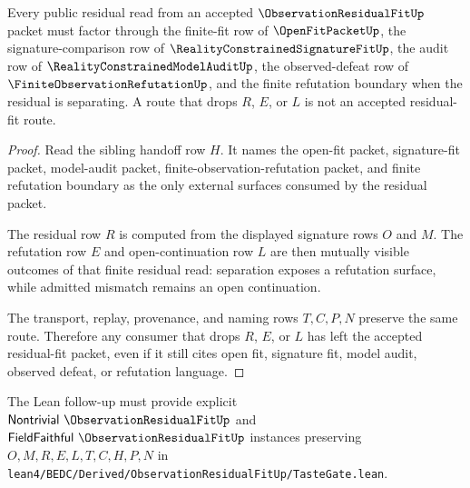 \begin{theorem}
\label{thm:observation-residual-fit-sibling-route}
Every public residual read from an accepted $\ObservationResidualFitUp$ packet must factor through the finite-fit row of $\OpenFitPacketUp$, the signature-comparison row of $\RealityConstrainedSignatureFitUp$, the audit row of $\RealityConstrainedModelAuditUp$, the observed-defeat row of $\FiniteObservationRefutationUp$, and the finite refutation boundary when the residual is separating. A route that drops $R$, $E$, or $L$ is not an accepted residual-fit route.
\end{theorem}
\begin{proof}
Read the sibling handoff row $H$. It names the open-fit packet, signature-fit packet, model-audit packet, finite-observation-refutation packet, and finite refutation boundary as the only external surfaces consumed by the residual packet.

The residual row $R$ is computed from the displayed signature rows $O$ and $M$. The refutation row $E$ and open-continuation row $L$ are then mutually visible outcomes of that finite residual read: separation exposes a refutation surface, while admitted mismatch remains an open continuation.

The transport, replay, provenance, and naming rows $T,C,P,N$ preserve the same route. Therefore any consumer that drops $R$, $E$, or $L$ has left the accepted residual-fit packet, even if it still cites open fit, signature fit, model audit, observed defeat, or refutation language.
\end{proof}



The Lean follow-up must provide explicit $\mathsf{Nontrivial}\ \ObservationResidualFitUp$ and $\mathsf{FieldFaithful}\ \ObservationResidualFitUp$ instances preserving $O,M,R,E,L,T,C,H,P,N$ in \texttt{lean4/BEDC/Derived/ObservationResidualFitUp/TasteGate.lean}.

